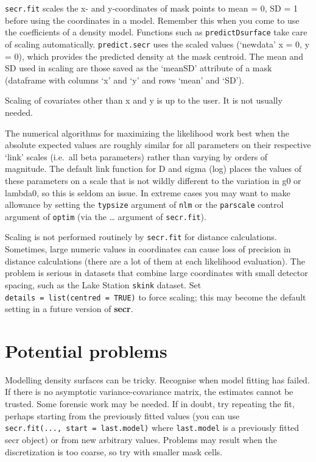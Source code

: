\documentclass[
]{book}
\begin{document}
\texttt{secr.fit} scales the x- and y-coordinates of mask points to mean = 0, SD = 1 before using the coordinates in a model. Remember this when you come to use the coefficients of a density model. Functions such as \texttt{predictDsurface} take care of scaling automatically. \texttt{predict.secr} uses the scaled values (`newdata' x = 0, y = 0), which provides the predicted density at the mask centroid. The mean and SD used in scaling are those saved as the `meanSD' attribute of a mask (dataframe with columns `x' and `y' and rows `mean' and `SD').

Scaling of covariates other than x and y is up to the user. It is not usually needed.

The numerical algorithms for maximizing the likelihood work best when the absolute expected values are roughly similar for all parameters on their respective `link' scales (i.e.~all beta parameters) rather than varying by orders of magnitude. The default link function for D and sigma (log) places the values of these parameters on a scale that is not wildly different to the variation in g0 or lambda0, so this is seldom an issue. In extreme cases you may want to make allowance by setting the \texttt{typsize} argument of \texttt{nlm} or the \texttt{parscale} control argument of \texttt{optim} (via the \ldots{} argument of \texttt{secr.fit}).

Scaling is not performed routinely by \texttt{secr.fit} for distance calculations. Sometimes, large numeric values in coordinates can cause loss of precision in distance calculations (there are a lot of them at each likelihood evaluation). The problem is serious in datasets that combine large coordinates with small detector spacing, such as the Lake Station \texttt{skink} dataset. Set \texttt{details\ =\ list(centred\ =\ TRUE)} to force scaling; this may become the default setting in a future version of \textbf{secr}.

\section{Potential problems}\label{potential-problems}


Modelling density surfaces can be tricky. Recognise when model fitting has failed. If there is no asymptotic variance-covariance matrix, the estimates cannot be trusted. Some forensic work may be needed. If in doubt, try repeating the fit, perhaps starting from the previously fitted values (you can use \texttt{secr.fit(...,\ start\ =\ last.model)} where \texttt{last.model} is a previously fitted secr object) or from new arbitrary values. Problems may result when the discretization is too coarse, so try with smaller mask cells.
\end{document}
